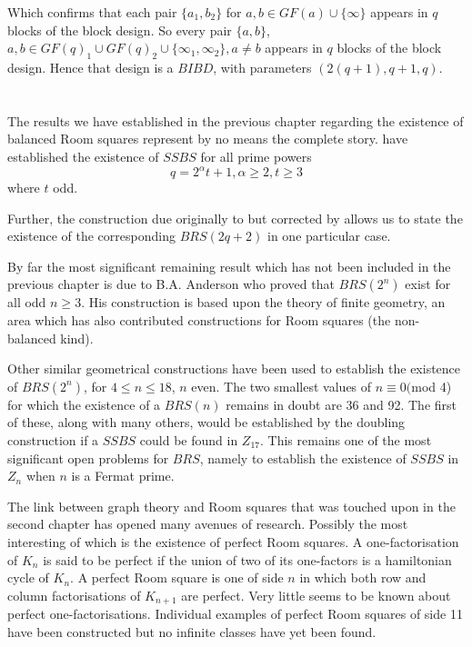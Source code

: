 \documentclass[
  11pt,
  a4paper]{book}\usepackage[]{graphicx}\usepackage[]{xcolor}
\newcounter{example}
\begin{document}
Which confirms that each pair $\{a_1, b_2\}$ for
$a, b \in GF(a) \cup \{\infty\}$ appears in $q$ blocks
of the block design.  So every pair $\{a, b\}$,
$a, b \in GF(q)_1 \cup GF(q)_2 \cup \{\infty _1, \infty _2\}, a \neq b$
appears in $q$ blocks of the block design. Hence that design
is a $BIBD$, with parameters $(2(q + 1), q + 1, q)$.
        

\chapter{}

The results we have established in the previous chapter regarding the
existence of balanced Room squares represent by no means the complete
story.
\cite{duExistenceSymmetricSkew1988}
have established the existence of $SSBS$ for
all prime powers
\begin{equation}
q = 2^{\alpha}t + 1, \alpha \geq 2, t \geq 3
\end{equation}
where $t$ odd.

Further, the construction due
originally to
\cite{hwangCompleteBalancedHowell1984}
but corrected by
\cite{andersonConstructionBalancedRoom1999}
allows us to
state the existence of the corresponding $BRS(2q + 2)$ in one particular
case.

By far the most significant remaining result which has not been included
in the previous chapter is due to B.A. Anderson who proved that
$BRS(2^n)$ exist for all odd $n \geq 3$. His construction is based upon
the theory of finite geometry, an area which has also contributed
constructions for Room squares (the non-balanced kind).

Other similar
geometrical constructions have been used to establish the existence of
$BRS(2^n)$, for $4 \leq n \leq 18$, $n$ even. The two smallest values of
$n \equiv 0($mod 4) for which the existence of a $BRS(n)$ remains in
doubt are 36 and 92. The first of these, along with many others, would
be established by the doubling construction if a $SSBS$ could be found
in $Z_{17}$. This remains one of the most significant open problems for
$BRS$, namely to establish the existence of $SSBS$ in $Z_n$ when $n$ is
a Fermat prime.

The link between graph theory and Room squares that was touched upon in
the second chapter has opened many avenues of research. Possibly the
most interesting of which is the existence of perfect Room squares. A
one-factorisation of $K_n$ is said to be perfect if the union of two of
its one-factors is a hamiltonian cycle of $K_n$. A perfect Room square
is one of side $n$ in which both row and column factorisations of
$K_{n + 1}$ are perfect. Very little seems to be known about perfect
one-factorisations. Individual examples of perfect Room squares of side
11 have been constructed but no infinite classes have yet been found.

\backmatter
\printbibliography[title=References]
\end{document}
